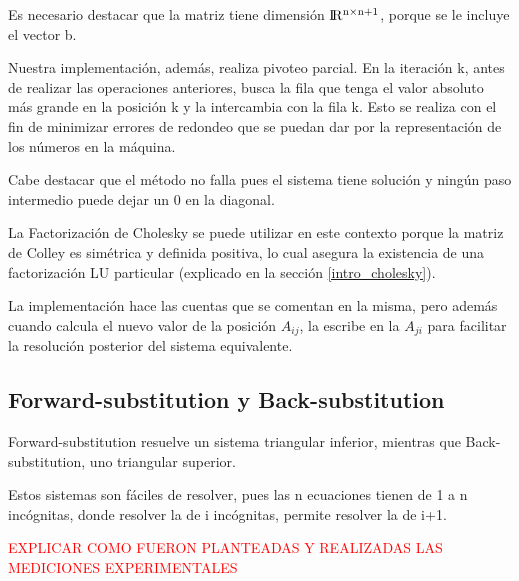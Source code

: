Es necesario destacar que la matriz tiene dimensi\'on $\rm I\!R^{n \times n+1}$, porque se le incluye el vector b.

Nuestra implementaci\'on, adem\'as, realiza pivoteo parcial. En la iteraci\'on k, antes de realizar las operaciones anteriores, busca la fila que tenga el valor absoluto m\'as grande en la posici\'on k y la intercambia con la fila k. Esto se realiza con el fin de minimizar errores de redondeo que se puedan dar por la representaci\'on de los n\'umeros en la m\'aquina.

Cabe destacar que el m\'etodo no falla pues el sistema tiene soluci\'on y ning\'un paso intermedio puede dejar un 0 en la diagonal.

La Factorizaci\'on de Cholesky se puede utilizar en este contexto porque la matriz de Colley es sim\'etrica y definida positiva, lo cual asegura la existencia de una factorizaci\'on LU particular (explicado en la secci\'on \ref{intro_cholesky}).

La implementaci\'on hace las cuentas que se comentan en la misma, pero adem\'as cuando calcula el nuevo valor de la posici\'on $A_{ij}$, la escribe en la $A_{ji}$ para facilitar la resoluci\'on posterior del sistema equivalente.

\subsection{Forward-substitution y Back-substitution}
Forward-substitution resuelve un sistema triangular inferior, mientras que Back-substitution, uno triangular superior.

Estos sistemas son f\'aciles de resolver, pues las n ecuaciones tienen de 1 a n inc\'ognitas, donde resolver la de i inc\'ognitas, permite resolver la de i+1.

\textcolor{red}{EXPLICAR COMO FUERON PLANTEADAS Y REALIZADAS LAS MEDICIONES EXPERIMENTALES}